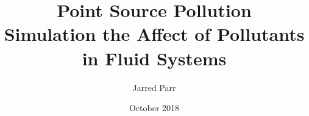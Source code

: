 \documentclass[11pt]{article}
\begin{document}
\title{%
  Point Source Pollution \\
  \large Simulation the Affect of Pollutants in Fluid Systems}
\author{Jarred Parr}

\date{October 2018}
\maketitle
\end{document}
